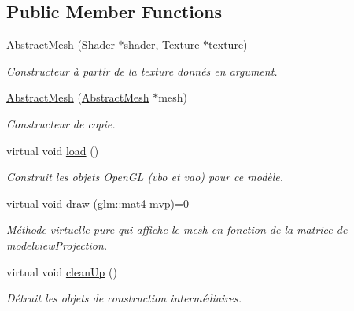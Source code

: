 \subsection*{Public Member Functions}
\begin{DoxyCompactItemize}
\item 
\hypertarget{classAbstractMesh_ade7bd3d65928c4676be31263bafc8a71}{\hyperlink{classAbstractMesh_ade7bd3d65928c4676be31263bafc8a71}{Abstract\-Mesh} (\hyperlink{classShader}{Shader} $\ast$shader, \hyperlink{classTexture}{Texture} $\ast$texture)}\label{classAbstractMesh_ade7bd3d65928c4676be31263bafc8a71}

\begin{DoxyCompactList}\small\item\em Constructeur à partir de la texture donnés en argument. \end{DoxyCompactList}\item 
\hypertarget{classAbstractMesh_a6a2a3bd0e2e321707ec7fef7ff933ba6}{\hyperlink{classAbstractMesh_a6a2a3bd0e2e321707ec7fef7ff933ba6}{Abstract\-Mesh} (\hyperlink{classAbstractMesh}{Abstract\-Mesh} $\ast$mesh)}\label{classAbstractMesh_a6a2a3bd0e2e321707ec7fef7ff933ba6}

\begin{DoxyCompactList}\small\item\em Constructeur de copie. \end{DoxyCompactList}\item 
\hypertarget{classAbstractMesh_a9688f69d4431eb08c7b65693d0fffd9e}{virtual void \hyperlink{classAbstractMesh_a9688f69d4431eb08c7b65693d0fffd9e}{load} ()}\label{classAbstractMesh_a9688f69d4431eb08c7b65693d0fffd9e}

\begin{DoxyCompactList}\small\item\em Construit les objets Open\-G\-L (vbo et vao) pour ce modèle. \end{DoxyCompactList}\item 
\hypertarget{classAbstractMesh_aef065877afe59562920748e265196c82}{virtual void \hyperlink{classAbstractMesh_aef065877afe59562920748e265196c82}{draw} (glm\-::mat4 mvp)=0}\label{classAbstractMesh_aef065877afe59562920748e265196c82}

\begin{DoxyCompactList}\small\item\em Méthode virtuelle pure qui affiche le mesh en fonction de la matrice de modelview\-Projection. \end{DoxyCompactList}\item 
\hypertarget{classAbstractMesh_a996ae58b3352c31f834a07ab0b071d6c}{virtual void \hyperlink{classAbstractMesh_a996ae58b3352c31f834a07ab0b071d6c}{clean\-Up} ()}\label{classAbstractMesh_a996ae58b3352c31f834a07ab0b071d6c}

\begin{DoxyCompactList}\small\item\em Détruit les objets de construction intermédiaires. \end{DoxyCompactList}\end{DoxyCompactItemize}
